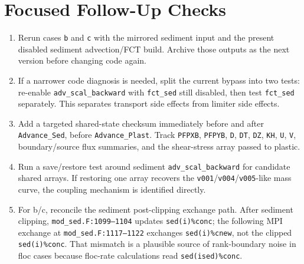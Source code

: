 \documentclass[11pt]{article}
\begin{document}
\section*{Focused Follow-Up Checks}
\begin{enumerate}
\item Rerun cases \texttt{b} and \texttt{c} with the mirrored sediment input and
the present disabled sediment advection/FCT build.  Archive those outputs as the
next version before changing code again.

\item If a narrower code diagnosis is needed, split the current bypass into two
tests: re-enable \texttt{adv\_scal\_backward} with \texttt{fct\_sed} still
disabled, then test \texttt{fct\_sed} separately.  This separates transport
side effects from limiter side effects.

\item Add a targeted shared-state checksum immediately before and after
\texttt{Advance\_Sed}, before \texttt{Advance\_Plast}.  Track
\texttt{PFPXB}, \texttt{PFPYB}, \texttt{D}, \texttt{DT}, \texttt{DZ},
\texttt{KH}, \texttt{U}, \texttt{V}, boundary/source flux summaries, and the
shear-stress array passed to plastic.

\item Run a save/restore test around sediment \texttt{adv\_scal\_backward} for
candidate shared arrays.  If restoring one array recovers the
\texttt{v001}/\texttt{v004}/\texttt{v005}-like mass curve, the coupling
mechanism is identified directly.

\item For b/c, reconcile the sediment post-clipping exchange path.  After
sediment clipping, \texttt{mod\_sed.F:1099--1104} updates
\texttt{sed(i)\%conc}; the following MPI exchange at
\texttt{mod\_sed.F:1117--1122} exchanges \texttt{sed(i)\%cnew}, not the clipped
\texttt{sed(i)\%conc}.  That mismatch is a plausible source of rank-boundary
noise in floc cases because floc-rate calculations read
\texttt{sed(ised)\%conc}.
\end{enumerate}
\end{document}
